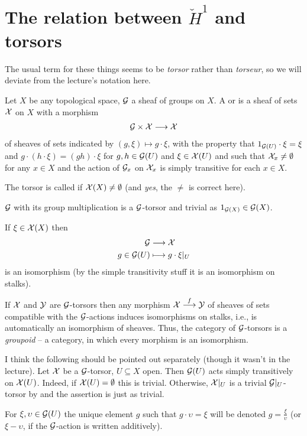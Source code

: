 \documentclass[a4paper,parskip=half,numbers=enddot, DIV=12]{scrreprt}
\begin{document}
\section{The relation between \texorpdfstring{$\check{H}^1$}{H} and torsors}
The usual term for these things seems to be \emph{torsor} rather than \emph{torseur}, so we will deviate from the lecture's notation here.
\begin{defi}
	Let $X$ be any topological space, $\mathcal{G}$ a sheaf of groups on $X$. A  or  is a sheaf of sets $\mathcal{X}$ on $X$ with a morphism
	\begin{align*}
		\Gg\times \Xx\morphism\Xx
	\end{align*}
	of sheaves of sets indicated by $(g,\xi)\mapsto g\cdot \xi$, with the property that $1_{\mathcal{G}(U)}\cdot \xi=\xi$ and $g\cdot(h\cdot \xi)=(gh)\cdot \xi$ for $g,h\in\mathcal{G}(U)$ and $\xi\in\mathcal{X}(U)$ and such that $\mathcal{X}_x\neq \emptyset$ for any $x\in X$ and the action of $\mathcal{G}_x$ on $\mathcal{X}_x$ is simply transitive for each $x\in X$.
	
	The torsor is called  if $\mathcal{X}(X)\neq \emptyset$ (and \emph{yes}, the $\neq$ is correct here).
\end{defi}
\begin{example}
	$\mathcal{G}$ with its group multiplication is a $\mathcal{G}$-torsor and trivial as $1_{\mathcal{G}(X)}\in\mathcal{G}(X)$.
\end{example}
\begin{rem}
	\begin{alphanumerate}
		\item {}If $\xi\in\mathcal{X}(X)$ then 
		\begin{align*}
			\Gg&\morphism\Xx\\
			g\in\Gg(U)&\longmapsto g\cdot \xi|_U
		\end{align*}
		is an isomorphism (by the simple transitivity stuff it is an isomorphism on stalks).
		\item If $\mathcal{X}$ and $\mathcal{Y}$ are $\mathcal{G}$-torsors then any morphism $\Xx\morphism[f]\Yy$ of sheaves of sets compatible with the $\mathcal{G}$-actions induces isomorphisms on stalks, i.e., is automatically an isomorphism of sheaves. Thus, the category of $\mathcal{G}$-torsors is a \emph{groupoid} -- a category, in which every morphism is an isomorphism.
		\item I think the following should be pointed out separately (though it wasn't in the lecture). Let $\mathcal{X}$ be a $\mathcal{G}$-torsor, $U\subseteq X$ open. Then $\mathcal{G}(U)$ acts simply transitively on $\mathcal{X}(U)$. Indeed, if $\mathcal{X}(U)=\emptyset$ this is trivial. Otherwise, $\mathcal{X}|_U$ is a trivial $\mathcal{G}|_U$-torsor by  and the assertion is just as trivial. 
		
		For $\xi,\upsilon\in\mathcal{G}(U)$ the unique element $g$ such that $g\cdot \upsilon=\xi$ will be denoted $g=\frac{\xi}{\upsilon}$ (or $\xi-\upsilon$, if the $\mathcal{G}$-action is written additively).
	\end{alphanumerate}		
\end{rem}
\end{document}
